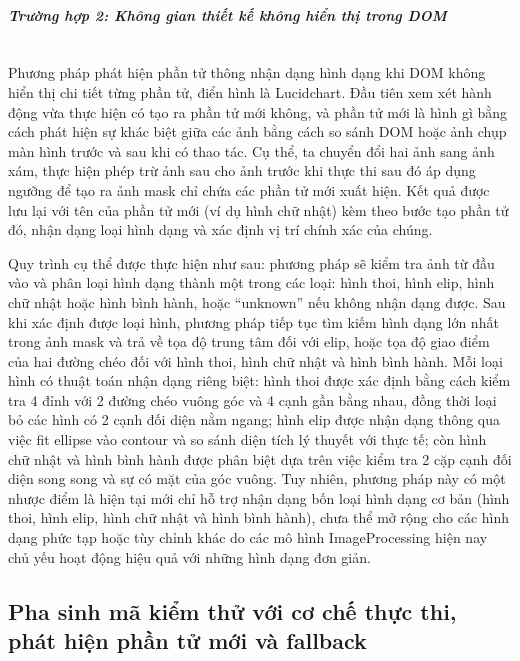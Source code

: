 \documentclass[a4paper, 12pt]{report}
\begin{document}
{\paragraph{\hspace*{1.2em}\textit{Trường hợp 2: Không gian thiết kế không hiển thị trong DOM}} \mbox{}\\[-1.5em]

Phương pháp phát hiện phần tử thông nhận dạng hình dạng khi DOM không hiển thị chi tiết từng phần tử, điển hình là Lucidchart. Đầu tiên xem xét hành động vừa thực hiện có tạo ra phần tử mới không, và phần tử mới là hình gì bằng cách phát hiện sự khác biệt giữa các ảnh bằng cách so sánh DOM hoặc ảnh chụp màn hình trước và sau khi có thao tác. Cụ thể, ta chuyển đổi hai ảnh sang ảnh xám, thực hiện phép trừ ảnh sau cho ảnh trước khi thực thi sau đó áp dụng ngưỡng để tạo ra ảnh mask chỉ chứa các phần tử mới xuất hiện. Kết quả được lưu lại với tên của phần tử mới (ví dụ hình chữ nhật) kèm theo bước tạo phần tử đó, nhận dạng loại hình dạng và xác định vị trí chính xác của chúng. 


Quy trình cụ thể được thực hiện như sau: phương pháp sẽ kiểm tra ảnh từ đầu vào và phân loại hình dạng thành một trong các loại: hình thoi, hình elip, hình chữ nhật hoặc hình bình hành, hoặc ``unknown'' nếu không nhận dạng được. Sau khi xác định được loại hình, phương pháp tiếp tục tìm kiếm hình dạng lớn nhất trong ảnh mask và trả về tọa độ trung tâm đối với elip, hoặc tọa độ giao điểm của hai đường chéo đối với hình thoi, hình chữ nhật và hình bình hành. Mỗi loại hình có thuật toán nhận dạng riêng biệt: hình thoi được xác định bằng cách kiểm tra 4 đỉnh với 2 đường chéo vuông góc và 4 cạnh gần bằng nhau, đồng thời loại bỏ các hình có 2 cạnh đối diện nằm ngang; hình elip được nhận dạng thông qua việc fit ellipse vào contour và so sánh diện tích lý thuyết với thực tế; còn hình chữ nhật và hình bình hành được phân biệt dựa trên việc kiểm tra 2 cặp cạnh đối diện song song và sự có mặt của góc vuông. Tuy nhiên, phương pháp này có một nhược điểm là hiện tại mới chỉ hỗ trợ nhận dạng bốn loại hình dạng cơ bản (hình thoi, hình elip, hình chữ nhật và hình bình hành), chưa thể mở rộng cho các hình dạng phức tạp hoặc tùy chỉnh khác do các mô hình \gls{ImageProcessing} hiện nay chủ yếu hoạt động hiệu quả với những hình dạng đơn giản.







\subsection{Pha sinh mã kiểm thử với cơ chế thực thi, phát hiện phần tử mới và fallback}







}
\end{document}
